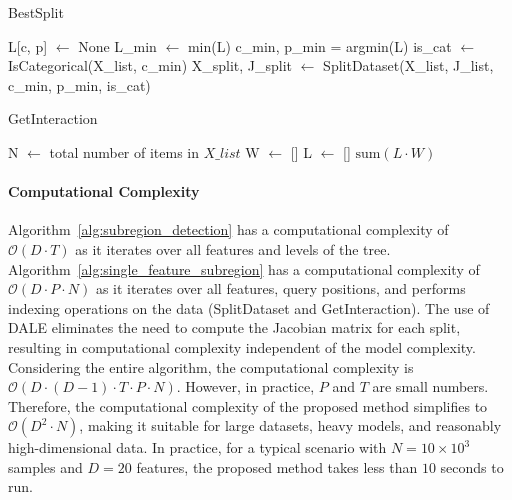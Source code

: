 \documentclass[12pt]{article}
\begin{document}
\begin{algorithm}
\caption{BestSplit}
\label{alg:single_feature_subregion}
\SetAlgoLined
{}


\BlankLine
L[c, p] $\gets$ None\; %
L\_min $\gets$ min(L)\;
c\_min, p\_min = argmin(L)\;
is\_cat $\gets$ IsCategorical(X\_list, c\_min)\;
X\_split, J\_split $\gets$ SplitDataset(X\_list, J\_list, c\_min, p\_min, is\_cat)\;

\BlankLine
\end{algorithm}

\begin{algorithm}
\caption{GetInteraction}
\label{alg:get_interaction}
\SetAlgoLined
{}
N $\gets$ total number of items in $X\_list$\;
W $\gets$ []\;
L $\gets$ []\;
\Return $\text{sum}(L \cdot W)$\;
\end{algorithm}



\paragraph{Computational Complexity}


Algorithm~\ref{alg:subregion_detection} has a computational complexity of $\mathcal{O}(D \cdot T)$
as it iterates over all features and levels of the tree.
Algorithm~\ref{alg:single_feature_subregion} has a computational complexity of $\mathcal{O}(D \cdot P \cdot N)$
as it iterates over all features, query positions, and performs indexing operations on the data (SplitDataset and GetInteraction).
The use of DALE eliminates the need to compute the Jacobian matrix for each split,
resulting in computational complexity independent of the model complexity.
Considering the entire algorithm, the computational complexity is $\mathcal{O}(D \cdot (D-1) \cdot T \cdot P \cdot N)$.
However, in practice, $P$ and $T$ are small numbers.
Therefore, the computational complexity of the proposed method simplifies to $\mathcal{O}(D^2 \cdot N)$,
making it suitable for large datasets, heavy models, and reasonably high-dimensional data.
In practice, for a typical scenario with $N=10 \times 10^3$ samples and $D=20$ features, the proposed method takes less than $10$ seconds to run.
\end{document}
